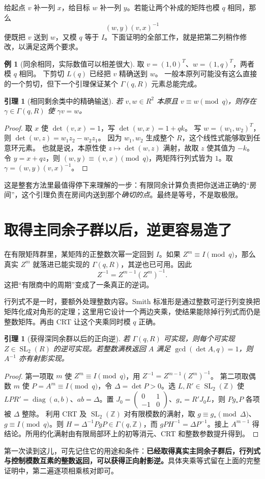 \documentclass[11pt,a4paper,oneside,openany]{book}
\newcommand{\Z}{\mathbb Z}
\newcommand{\SL}{\operatorname{SL}}
\newcommand{\diag}{\operatorname{diag}}
\newtheorem{lemma}[theorem]{引理}
\theoremstyle{definition}
\newtheorem{example}[theorem]{例}
\numberwithin{equation}{chapter}
\begin{document}
给起点 $v$ 补一列 $x$，给目标 $w$ 补一列 $y$。若能让两个补成的矩阵也模 $q$ 相同，那么
\[(w,y)(v,x)^{-1}
\]
便既把 $v$ 送到 $w$，又模 $q$ 等于 $I$。下面证明的全部工作，就是把第二列稍作修改，以满足这两个要求。
\begin{example}[同余相同，实际数值可以相差很大]
取 $v=(1,0)^T$、$w=(1,q)^T$，两者模 $q$ 相同。
下剪切 $L(q)$ 已经把 $v$ 精确送到 $w$。
一般本原列可能没有这么直接的一个剪切，但下一个引理保证某个 $\Gamma(q,R)$ 元素总能完成。
\end{example}
\begin{lemma}[相同剩余类中的精确输送]\label{lem:fiber}
若 $v,w\in R^2$ 本原且 $v\equiv w\pmod q$，则存在 $\gamma\in\Gamma(q,R)$ 使 $\gamma v=w$。
\end{lemma}
\begin{proof}
取 $x$ 使 $\det(v,x)=1$，写 $\det(w,x)=1+qk$。
写 $w=(w_1,w_2)^T$，则 $\det(w,z)=w_1z_2-w_2z_1$。
因为 $w_1,w_2$ 生成整个 $R$，这个线性式能够取到任意环元素。
也就是说，本原性使 $z\mapsto\det(w,z)$ 满射，故取 $z$ 使其值为 $-k$。令 $y=x+qz$，则 $(w,y)\equiv(v,x)\pmod q$，两矩阵行列式皆为 $1$。取 $\gamma=(w,y)(v,x)^{-1}$。
\end{proof}
这是整套方法里最值得停下来理解的一步：有限同余计算负责把你送进正确的“房间”，这个引理负责在房间内送到那个\emph{确切的点}。最终是等号，不是取极限。

\section{取得主同余子群以后，逆更容易造了}
在有限矩阵群里，某矩阵的正整数次幂一定回到 $I$。如果 $Z^m\equiv I\pmod q$，那么真实 $Z^m$ 就落进已能实现的 $\Gamma(q,R)$，其逆也已可用。因此
\[Z^{-1}=Z^{m-1}(Z^m)^{-1}.
\]
这把“有限商中的周期”变成了一条真正的逆词。

行列式不是一时，要额外处理整数内容。Smith 标准形是通过整数可逆行列变换把矩阵化成对角形的定理；这里用它设计一个两边夹乘，使结果能除掉行列式而仍是整数矩阵。再由 CRT 让这个夹乘同时模 $q$ 正确。
\begin{lemma}[获得深同余群以后的正向逆]\label{lem:inverse}
若 $\Gamma(q,R)$ 可实现，则每个可实现 $Z\in\SL_2(R)$ 的逆可实现。若整数满秩返回 $A$ 满足 $\gcd(\det A,q)=1$，则 $A^{-1}$ 亦有射影实现。
\end{lemma}
\begin{proof}
第一项取 $m$ 使 $Z^m\equiv I\pmod q$，用 $Z^{-1}=Z^{m-1}(Z^m)^{-1}$。
第二项取偶数 $m$ 使 $P=A^m\equiv I\pmod q$，令 $\Delta=\det P>0$。选 $L,R'\in\SL_2(\Z)$ 使 $LPR'=\diag(a,b)$、$ab=\Delta$。置 $J_0=\left(\begin{smallmatrix}0&1\\-1&0\end{smallmatrix}\right)$、$g_*=R'J_0L$，则 $Pg_*P$ 各项被 $\Delta$ 整除。
利用 CRT 及 $\SL_2(\Z)$ 对有限模数的满射，取 $g\equiv g_*\pmod\Delta$、$g\equiv I\pmod q$。则 $H=\Delta^{-1}PgP\in\Gamma(q,\Z)$，而 $gPH^{-1}=\Delta P^{-1}$。接上 $A^{m-1}$ 得结论。所用约化满射由有限局部环上的初等消元、CRT 和整数参数提升得到。
\end{proof}
第一次读到这儿，可先记住它的用途和条件：\textbf{已经取得真实主同余子群后，行列式与控制模数互素的整数返回，可以获得正向射影逆。}具体夹乘等式留在上面的完整证明中，第二遍逐项相乘核对即可。
\end{document}
